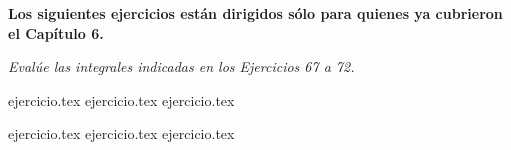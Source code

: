 \vspace{2em}
\noindent \textbf{\large Los siguientes ejercicios están dirigidos sólo para quienes ya cubrieron el Capítulo 6.}

\vspace{1em}
\noindent \textit{Evalúe las integrales indicadas en los Ejercicios 67 a 72.}

\begin{enumerate}
    \setcounter{enumi}{66}
    \begin{minipage}{0.45\textwidth}
    {ejercicio.tex}
    {ejercicio.tex}
    {ejercicio.tex}
    \end{minipage}%
    \begin{minipage}{0.45\textwidth}
    {ejercicio.tex}
    {ejercicio.tex}
    {ejercicio.tex}
    \end{minipage}
\end{enumerate}
